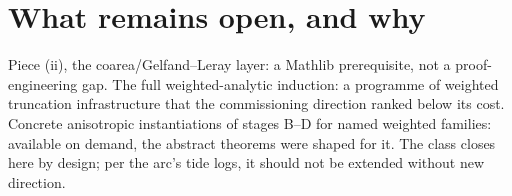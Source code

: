 \documentclass[11pt]{article}
\begin{document}
\section{What remains open, and why}

Piece (ii), the coarea/Gelfand--Leray layer: a Mathlib prerequisite,
not a proof-engineering gap. The full weighted-analytic induction: a
programme of weighted truncation infrastructure that the commissioning
direction ranked below its cost. Concrete anisotropic instantiations
of stages B--D for named weighted families: available on demand, the
abstract theorems were shaped for it. The class closes here by
design; per the arc's tide logs, it should not be extended without
new direction.
\end{document}
